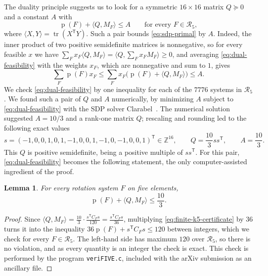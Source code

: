 \documentclass{article}
\theoremstyle{plain}
\newtheorem{lemma}[theorem]{Lemma}
\theoremstyle{definition}
\theoremstyle{remark}
\newcommand{\p}{\operatorname{p}}
\begin{document}
The duality principle suggests us to look for a symmetric \(16\times16\) matrix
\(Q\succeq0\) and a constant \(A\) with
\begin{equation}\label{eq:dual-feasibility}
\p(F)+\langle Q,M_F\rangle\leq A
\qquad\text{for every }F\in\mathcal R_5 ,
\end{equation}
where \(\langle X,Y\rangle=\operatorname{tr}(X^{\mathsf T}Y)\). Such
a pair bounds \eqref{eq:sdp-primal} by \(A\).  Indeed, the inner product of two positive
semidefinite matrices is nonnegative, so for every feasible \(x\) we
have \(\sum_Fx_F\langle Q,M_F\rangle
=\langle Q,\sum_Fx_FM_F\rangle\geq0\), and
averaging \eqref{eq:dual-feasibility} with the weights \(x_F\), which
are nonnegative and sum to \(1\), gives
\[
\sum_F\p(F)x_F
\leq\sum_Fx_F\bigl(\p(F)+\langle Q,M_F\rangle\bigr)\leq A .
\]
We check \eqref{eq:dual-feasibility} by one inequality for each of
the \(7776\) systems in \(\mathcal R_5\). We found such a pair of \(Q\) and \(A\) numerically, by minimizing \(A\) subject to \eqref{eq:dual-feasibility} with the SDP solver Clarabel~\cite{GoulartChen2026}.
The numerical solution suggested \(A = 10/3\) and a rank-one matrix \(Q\); rescaling and rounding led to the following exact values
\[
s=(-1,0,0,1,0,1,-1,0,0,1,-1,0,-1,0,0,1)^{\mathsf T}\in\mathbb Z^{16},
\qquad
Q=\frac{10}{3}ss^{\mathsf T},
\qquad
A=\frac{10}{3} .
\]
This \(Q\) is positive semidefinite, being a positive multiple of
\(ss^{\mathsf T}\).  For this pair, \eqref{eq:dual-feasibility} becomes the
following statement, the only computer-assisted ingredient of the
proof.

\begin{lemma}
\label{lem:finite-k5-certificate}
For every rotation system \(F\) on five elements,
\begin{equation}\label{eq:finite-k5-certificate}
\p(F)+\langle Q,M_F\rangle\leq\frac{10}{3} .
\end{equation}
\end{lemma}

\begin{proof}
Since \(\langle Q,M_F\rangle
=\frac{10}{3}\cdot\frac{s^{\mathsf T}C_Fs}{120}
=\frac{s^{\mathsf T}C_Fs}{36}\), multiplying
\eqref{eq:finite-k5-certificate} by \(36\) turns it into the
inequality \(36\p(F)+s^{\mathsf T}C_Fs\leq120\) between integers, which
we check for every \(F\in\mathcal R_5\).  The left-hand side has maximum
\(120\) over \(\mathcal R_5\), so there is no violation, and as every quantity is an integer
the check is exact. This check is performed by the program {\tt veriFIVE.c}, included
with the arXiv submission as an ancillary file.
\end{proof}
\end{document}

